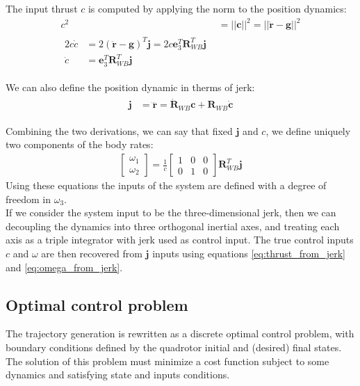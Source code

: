The input thrust $c$ is computed by applying the norm to the position dynamics:
\begin{align}
c^2 &= ||\boldsymbol{c}||^2 =  ||\ddot{\boldsymbol{r}} - \boldsymbol{g}||^2 \\[20pt] \label{eq:thrust_from_jerk}
\begin{split}
2c\dot{c} &= 2(\ddot{\boldsymbol{r}} - \boldsymbol{g})^T \boldsymbol{j} = 2 c\boldsymbol{e}_3^T\boldsymbol{R}_{WB}^T \boldsymbol{j}   \\[10pt]
\dot{c} &= \boldsymbol{e}_3^T\boldsymbol{R}_{WB}^T \boldsymbol{j} 
\end{split}
\end{align}

We can also define the position dynamic in therms of jerk:
\begin{align}
\begin{split}
\boldsymbol{j} &= \dddot{\boldsymbol{r}} = \dot{\boldsymbol{R}}_{WB}\boldsymbol{c} + \boldsymbol{R}_{WB}\dot{\boldsymbol{c}}
\end{split}
\end{align}

Combining the two derivations, we can say that fixed $\boldsymbol{j}$ and $c$, we define uniquely two components of the body rates:
\begin{align}
{\begin{bmatrix}
\omega_1 \\[10pt]
\omega_2
\end{bmatrix}}  = \frac{1}{c}
{\begin{bmatrix}
1 & 0 & 0  \\[10pt]
0 & 1 & 0
\end{bmatrix}}\boldsymbol{R}_{WB}^T \boldsymbol{j}
\label{eq:omega_from_jerk}
\end{align}
Using these equations the inputs of the system are defined with a degree of freedom in $\omega_3$.\\

If we consider the system input to be the three-dimensional jerk, then we can decoupling the dynamics into three orthogonal inertial axes, and treating each axis as a triple integrator with jerk used as control input. The true control inputs $c$ and $\omega$ are then recovered from $\boldsymbol{j}$  inputs using equations \ref{eq:thrust_from_jerk} and \ref{eq:omega_from_jerk}.


\subsection{Optimal control problem}
The trajectory generation is rewritten as a discrete optimal control problem, with boundary conditions defined by the quadrotor initial and (desired) final states. The solution of this problem must minimize a cost function subject to some dynamics and satisfying state and inputs conditions.\\

